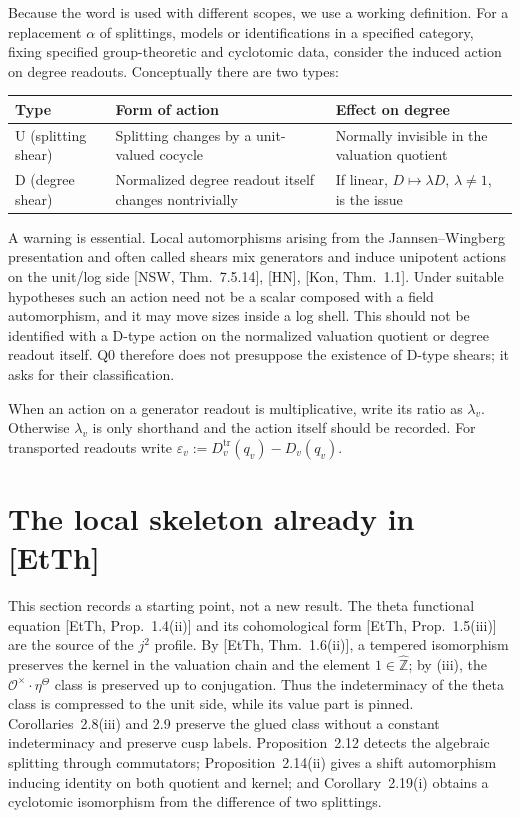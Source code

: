 \documentclass[11pt]{article}
\theoremstyle{definition}
\begin{document}
Because the word is used with different scopes, we use a working
definition.  For a replacement $\alpha$ of splittings, models or
identifications in a specified category, fixing specified
group-theoretic and cyclotomic data, consider the induced action
on degree readouts.  Conceptually there are two types:
\begin{center}
\small
\begin{tabular}{@{}p{}p{}p{}@{}}
\toprule
Type & Form of action & Effect on degree\\
\midrule
U (splitting shear) & Splitting changes by a unit-valued cocycle & Normally invisible in the valuation quotient\\
D (degree shear) & Normalized degree readout itself changes nontrivially & If linear, $D\mapsto\lambda D$, $\lambda\ne1$, is the issue\\
\bottomrule
\end{tabular}
\end{center}

A warning is essential.  Local automorphisms arising from the
Jannsen--Wingberg presentation and often called shears mix
generators and induce unipotent actions on the unit/log side
[NSW, Thm.~7.5.14], [HN], [Kon, Thm.~1.1].  Under suitable
hypotheses such an action need not be a scalar composed with a
field automorphism, and it may move sizes inside a log shell.
This should not be identified with a D-type action on the
normalized valuation quotient or degree readout itself.  Q0
therefore does not presuppose the existence of D-type shears; it
asks for their classification.

When an action on a generator readout is multiplicative, write
its ratio as $\lambda_v$.  Otherwise $\lambda_v$ is only shorthand
and the action itself should be recorded.  For transported
readouts write
$\varepsilon_v:=D_v^{\mathrm{tr}}(q_v)-D_v(q_v)$.

\section{The local skeleton already in [EtTh]}\label{s:skeleton}

This section records a starting point, not a new result.  The
theta functional equation [EtTh, Prop.~1.4(ii)] and its
cohomological form [EtTh, Prop.~1.5(iii)] are the source of the
$j^2$ profile.  By [EtTh, Thm.~1.6(ii)], a tempered isomorphism
preserves the kernel in the valuation chain and the element
$1\in\widehat{\mathbb Z}$; by (iii), the
$\mathcal O^\times\cdot\eta^\Theta$ class is preserved up to
conjugation.  Thus the indeterminacy of the theta class is
compressed to the unit side, while its value part is pinned.
Corollaries~2.8(iii) and 2.9 preserve the glued class without a
constant indeterminacy and preserve cusp labels.  Proposition~2.12
detects the algebraic splitting through commutators;
Proposition~2.14(ii) gives a shift automorphism inducing identity
on both quotient and kernel; and Corollary~2.19(i) obtains a
cyclotomic isomorphism from the difference of two splittings.
\end{document}
